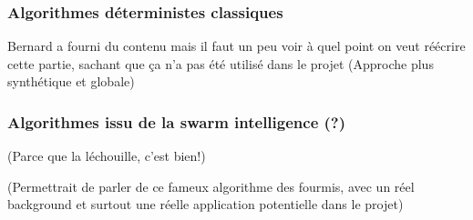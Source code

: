 \subsubsection{Algorithmes déterministes classiques}

Bernard a fourni du contenu mais il faut un peu voir à quel point on veut réécrire cette partie, sachant que ça n'a pas été utilisé dans le projet (Approche plus synthétique et globale)

\subsubsection{Algorithmes issu de la swarm intelligence (?)}

\cite{pheromonesForaging,antOpti} (Parce que la léchouille, c'est bien!)

(Permettrait de parler de ce fameux algorithme des fourmis, avec un réel background et surtout une réelle application potentielle dans le projet)

